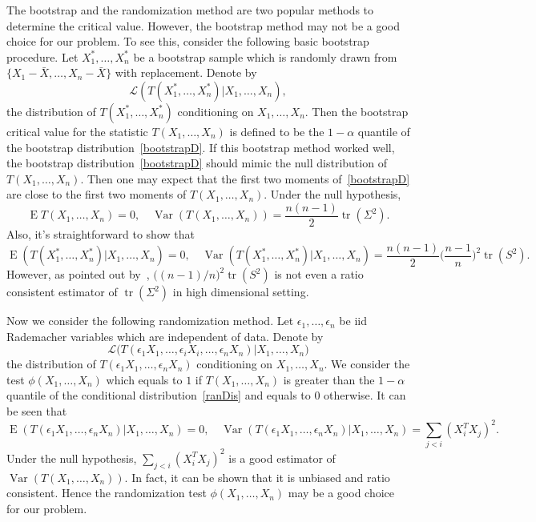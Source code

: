 \documentclass[3p]{elsarticle}
\DeclareMathOperator{\mytr}{tr}
\DeclareMathOperator{\myE}{E}
\DeclareMathOperator{\myVar}{Var}
\theoremstyle{plain}
\theoremstyle{definition}
\theoremstyle{remark}
\begin{document}
The bootstrap and the randomization method are two popular methods to determine the critical value.
However, the bootstrap method may not be a good choice for our problem.
To see this, consider the following basic bootstrap procedure.
Let $X_1^*,\ldots,X_n^*$ be a bootstrap sample which is randomly drawn from $\{X_1-\bar{X},\ldots,X_n-\bar{X}\}$ with replacement.
Denote by 
\begin{equation}\label{bootstrapD}
 \mathcal{L}(T(X_1^*,\ldots,X_n^*)|X_1,\ldots,X_n),
\end{equation}
the distribution of $T(X_1^*,\ldots,X_n^*)$ conditioning on $X_1,\ldots,X_n$.
Then the bootstrap critical value for the statistic $T(X_1,\ldots,X_n)$ is defined to be the $1-\alpha$ quantile of the bootstrap distribution~\eqref{bootstrapD}.
If this bootstrap method worked well, the bootstrap distribution~\eqref{bootstrapD} should mimic the null distribution of $T(X_1,\ldots,X_n)$.
Then one may expect that the first two moments of~\eqref{bootstrapD} are close to the first two moments of $T(X_1,\ldots,X_n)$.
        Under the null hypothesis,
        $$
 \myE T(X_1,\ldots,X_n)=0,
 \quad
 \myVar(T(X_1,\ldots,X_n))=\frac{n(n-1)}{2} \mytr(\Sigma^2).
        $$
Also, it's straightforward to show that
$$
 \myE(T(X_1^*,\ldots,X_n^*)|X_1,\ldots,X_n)=0,
 \quad
 \myVar(T(X_1^*,\ldots,X_n^*)|X_1,\ldots,X_n)=\frac{n(n-1)}{2}\big(\frac{n-1}{n}\big)^2 \mytr(S^2).
$$
However, as pointed out by~\cite{Bai1996Efiect}, $\big((n-1)/{n}\big)^2 \mytr(S^2)$ is not even a ratio consistent estimator of $\mytr(\Sigma^2)$ in high dimensional setting.

Now we consider the following randomization method.
Let $\epsilon_1,\ldots,\epsilon_n$ be iid Rademacher variables which are independent of data.
Denote by
\begin{equation}\label{ranDis}
    \mathcal{L}\big(T(\epsilon_1 X_1,\ldots,\epsilon_i X_i,\ldots,\epsilon_n X_n)|X_1,\ldots,X_n\big)
\end{equation}
the distribution of $T(\epsilon_1 X_1,\ldots,\epsilon_n X_n)$ conditioning on $X_1,\ldots,X_n$.
We consider the test $\phi(X_1,\ldots,X_n)$ which equals to $1$ if $T(X_1,\ldots, X_n)$ is greater than the $1-\alpha$ quantile of the conditional distribution~\eqref{ranDis} and equals to $0$ otherwise.
It can be seen that
$$
 \myE(T(\epsilon_1 X_1,\ldots,\epsilon_n X_n)|X_1,\ldots,X_n)=0,
 \quad
 \myVar(T(\epsilon_1 X_1,\ldots,\epsilon_n X_n)|X_1,\ldots,X_n)=\sum_{j<i} (X_i^T X_j)^2.
$$
Under the null hypothesis, $\sum_{j<i} (X_i^T X_j)^2$ is a good estimator of $\myVar(T(X_1,\ldots,X_n))$.
In fact, it can be shown that it is unbiased and ratio consistent.
Hence the randomization test $\phi(X_1,\ldots,X_n)$ may be a good choice for our problem.
\end{document}
